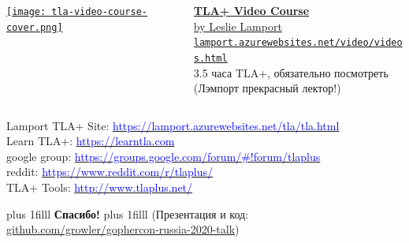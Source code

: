 \documentclass[
  11pt,aspectratio=1610,pdf,hyperref={unicode,colorlinks=false}
]{beamer}
\begin{document}
\begin{frame}[c]
  \begin{columns}
    \begin{column}{.45\textwidth}
      \centering
      \href{http://lamport.azurewebsites.net/video/videos.html}{%
        \texttt{[image: tla-video-course-cover.png]}
      }
    \end{column}
    \begin{column}{.45\textwidth}
      \href{http://lamport.azurewebsites.net/video/videos.html}{%
        {\Large\bf TLA+ Video Course}\\
        {\normalsize by Leslie Lamport}\\
        {\tiny \nolinkurl{lamport.azurewebsites.net/video/videos.html}}
      }\\
      \vspace{3ex}
      \large
      3.5 часа TLA+, обязательно посмотреть\\
      \vspace{3ex}
      (Лэмпорт прекрасный лектор!)
    \end{column}
  \end{columns}
\end{frame}

\begin{frame}[c]
  \centering\large%
  \vfill%
  \begin{beamercolorbox}{}
    Lamport TLA+ Site: \href{https://lamport.azurewebsites.net/tla/tla.html}{\textcolor{blue}{https://lamport.azurewebsites.net/tla/tla.html}}\\[2ex]
    Learn TLA+: \href{https://learntla.com/}{\textcolor{blue}{https://learntla.com}}\\[2ex]
    google group: \href{https://groups.google.com/forum/\#!forum/tlaplus}{\textcolor{blue}{https://groups.google.com/forum/\#!forum/tlaplus}}\\[2ex]
    reddit: \href{https://www.reddit.com/r/tlaplus/}{\textcolor{blue}{https://www.reddit.com/r/tlaplus/}}\\[2ex]
    TLA+ Tools: \href{http://www.tlaplus.net/}{\textcolor{blue}{http://www.tlaplus.net/}}
  \end{beamercolorbox}
  \vfill%
\end{frame}

\newcommand{\btVFill}{\vskip0pt plus 1filll}
\begin{frame}
  \centering%
  \btVFill%
  {\Huge\bf Спасибо!}
  \btVFill%
  {\scriptsize\textcolor{black!70}{(Презентация и код: \href{https://github.com/growler/gophercon-russia-2020-talk}{github.com/growler/gophercon-russia-2020-talk})}\\}
\end{frame}
\end{document}
